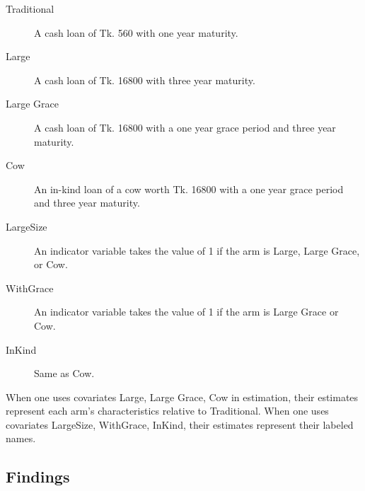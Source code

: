 \begin{description}
\vspace{1.0ex}\setlength{\itemsep}{1.0ex}\setlength{\baselineskip}{12pt}
\item[Traditional]	A cash loan of Tk. 560 with one year maturity.
\item[Large]	A cash loan of Tk. 16800 with three year maturity.
\item[Large Grace]	A cash loan of Tk. 16800 with a one year grace period and three year maturity.
\item[Cow]	An in-kind loan of a cow worth Tk. 16800 with a one year grace period and three year maturity.
\item[LargeSize]	An indicator variable takes the value of 1 if the arm is Large, Large Grace, or Cow.
\item[WithGrace]	An indicator variable takes the value of 1 if the arm is Large Grace or Cow.
\item[InKind]	Same as Cow.
\end{description}
When one uses covariates \textsf{Large, Large Grace, Cow} in estimation, their estimates represent each arm's characteristics relative to \textsf{Traditional}. When one uses covariates \textsf{LargeSize, WithGrace, InKind}, their estimates represent their labeled names.

\subsection{Findings}

